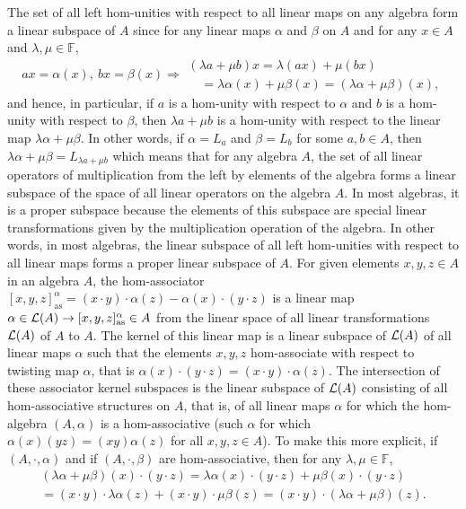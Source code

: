 \documentclass[12pt]{article}
\begin{document}
		The set of all left hom-unities with respect to all linear maps on any algebra form a linear subspace of $A$ since for any linear maps $\alpha$ and $\beta$ on $A$ and for any $x\in A$ and $\lambda,\mu\in\mathbb{F}$,
		$$ax=\alpha(x),\ bx=\beta(x) \Rightarrow
		\begin{array}{l}
			(\lambda a +\mu b) x= \lambda (ax)+\mu (bx) \\
			\quad = \lambda \alpha(x)+\mu\beta(x)=(\lambda \alpha+\mu\beta)(x),
		\end{array}$$
		and hence, in particular, if $a$ is a hom-unity with respect to $\alpha$ and $b$ is a hom-unity with respect to $\beta$, then $\lambda a +\mu b$ is a hom-unity with respect to the linear map $\lambda \alpha+\mu\beta$. In other words, if  $\alpha=L_a$ and $\beta=L_b$ for some $a,b\in A$, then
		$\lambda \alpha+\mu\beta=L_{\lambda a +\mu b}$ which means that for any algebra $A$, the set of all linear operators of multiplication from the left by elements of the algebra forms a linear subspace of the space of all linear operators on the algebra $A$. In most algebras, it is a proper subspace because the elements of this subspace are special linear transformations given by the multiplication operation of the algebra. In other words, in most algebras, the linear subspace of all left hom-unities with respect to all linear maps forms a proper linear subspace of $A$.
		For given elements $x,y,z\in A$ in an algebra $A$, the hom-associator
		$[x,y,z]_{\mathrm{as}}^\alpha=(x\cdot y)\cdot \alpha(z)-\alpha(x)\cdot (y\cdot z)$ is a linear map $\alpha\in {\cal L}(A) \to [x,y,z]_{\mathrm{as}}^\alpha \in A$ from the linear space of all linear transformations ${\cal L}(A)$ of $A$  to $A$.
		The kernel of this linear map is a linear subspace of ${\cal L}(A)$ of all linear maps $\alpha$ such that the elements $x,y,z$ hom-associate with respect to twisting map $\alpha$, that is
		$\alpha(x)\cdot (y\cdot z)=(x\cdot y)\cdot \alpha(z)$. The intersection of these associator kernel subspaces is the linear subspace of ${\cal L}(A)$ consisting of all hom-associative structures on $A$, that is, of all linear maps $\alpha$ for which the hom-algebra $(A,\alpha)$ is a hom-associative (such $\alpha$ for which $\alpha(x)(yz)=(xy)\alpha(z)$ for all $x,y,z\in A$).
		To make this more explicit, if $(A,\cdot,\alpha)$ and if $(A,\cdot,\beta)$ are hom-associative, then for any $\lambda,\mu\in\mathbb{F}$,
		\begin{multline*}
			(\lambda \alpha+\mu \beta)(x)\cdot (y\cdot z)=\lambda \alpha(x)\cdot (y\cdot z)+\mu \beta(x)\cdot (y\cdot z)\\
			=(x\cdot y)\cdot \lambda \alpha(z)+(x\cdot y)\cdot \mu \beta(z)=(x\cdot y)\cdot (\lambda \alpha+\mu \beta)(z).
		\end{multline*}
\end{document}
